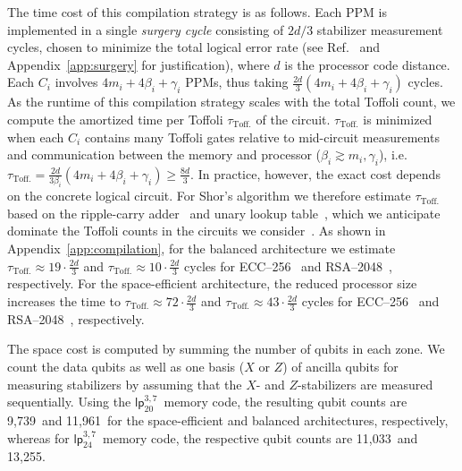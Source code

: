 \documentclass[reprint,twocolumn,secnumarabic,amssymb, aps, prx]{revtex4-2}
\newcommand{\lpmemlarge}{\mbox{$\mathsf{lp}_{24}^{3, 7}$}}
\newcommand{\lpmemmed}{\mbox{$\mathsf{lp}^{3, 7}_{20}$}}
\newcommand{\nspacemed}{9,739}
\newcommand{\nbalancedmed}{11,961}
\newcommand{\nspacelarge}{11,033}
\newcommand{\nbalancedlarge}{13,255}
\newcommand{\ttoff}{\tau_\text{Toff.}}
\newcommand{\ttoffeccbalanced}{19\cdot\frac{2d}{3}}
\newcommand{\ttoffrsabalanced}{10\cdot\frac{2d}{3}}
\newcommand{\ttoffeccspace}{72\cdot\frac{2d}{3}}
\newcommand{\ttoffrsaspace}{43\cdot\frac{2d}{3}}
\newcommand{\ecc}{\mbox{ECC--256}}
\newcommand{\rsa}{\mbox{RSA--2048}}
\begin{document}
The time cost of this compilation strategy is as follows. Each PPM is implemented in a single \emph{surgery cycle} consisting of $2d/3$ stabilizer measurement cycles, chosen to minimize the total logical error rate (see Ref.~\cite{cross2024improved} and Appendix~\ref{app:surgery} for justification), where $d$ is the processor code distance. Each  $C_i$ involves \mbox{$4m_i + 4\beta_i + \gamma_i$} PPMs, thus taking \mbox{$\frac{2d}{3}(4m_i + 4\beta_i + \gamma_i)$} cycles. As the runtime of this compilation strategy scales with the total Toffoli count, we compute the amortized time per Toffoli $\ttoff$ of the circuit. $\ttoff$ is minimized when each $C_i$ contains many Toffoli gates relative to mid-circuit measurements and communication between the memory and processor (\mbox{$\beta_i \gtrsim m_i, \gamma_i$}), i.e. \mbox{$\ttoff=\frac{2d}{3\beta_i}(4m_i + 4\beta_i + \gamma_i) \geq \frac{8d}{3}$.} In practice, however, the exact cost depends on the concrete logical circuit. For Shor's algorithm we therefore estimate $\ttoff$ based on the ripple-carry adder~\cite{vedral1996quantum, cuccaro2004new, gidney2018halving} and unary lookup table~\cite{babbush2018encoding}, which we anticipate dominate the Toffoli counts in the circuits we consider~\cite{gidney2019how, chevignard2025reducing, gidney2025how, proos2003shor, roetteler2017quantum, haner2020improved, litinski2023compute, gouzien2023performance, babbush2026quantum}. As shown in Appendix~\ref{app:compilation}, for the balanced architecture we estimate \mbox{$\ttoff \approx\ttoffeccbalanced$} and \mbox{$\ttoff\approx\ttoffrsabalanced$} cycles for \ecc~\cite{babbush2026quantum} and \rsa~\cite{gidney2019how, gidney2025how}, respectively. For the space-efficient architecture, the reduced processor size increases the time to \mbox{$\ttoff \approx \ttoffeccspace$} and \mbox{$\ttoff \approx \ttoffrsaspace$} cycles for \ecc~\cite{babbush2026quantum} and \rsa~\cite{gidney2019how, gidney2025how}, respectively. 

The space cost is computed by summing the number of qubits in each zone. We count the data qubits as well as one basis ($X$ or $Z$) of ancilla qubits for measuring stabilizers by assuming that the $X$- and $Z$-stabilizers are measured sequentially. Using the \lpmemmed\ memory code, the resulting qubit counts are \nspacemed\ and \nbalancedmed\ for the space-efficient and balanced architectures, respectively, whereas for \lpmemlarge\ memory code, the respective qubit counts are \nspacelarge\ and \nbalancedlarge.
\end{document}

